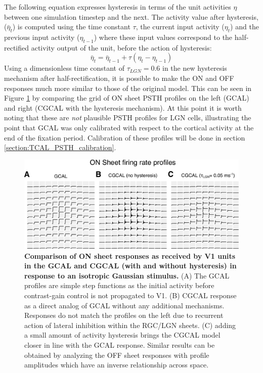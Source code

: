 \documentclass[phd,ianc,twoside]{infthesis}
\begin{document}
The following equation expresses hysteresis in terms of the unit
activities $\eta$ between one simulation timestep and the next. The
activity value after hysteresis, ($\bar{\eta}_t$) is computed using the
time constant $\tau$, the current input activity ($\eta_t$) and the
previous input activity ($\eta_{t-1}$) where these input values
correspond to the half-rectified activity output of the unit, before the
action of hysteresis:
\begin{equation}
  \bar{\eta}_t = \bar{\eta}_{t-1} + \tau (\eta_t - \eta_{t-1})
  \label{eq:hysteresis}
\end{equation}
Using a dimensionless time constant of $\tau_{LGN}=0.6$ in the new
hysteresis mechanism after half-rectification, it is possible to make
the ON and OFF responses much more similar to those of the original
model. This can be seen in Figure \ref{fig:CGCAL_LGN} by comparing the
grid of ON sheet PSTH profiles on the left (GCAL) and right (CGCAL with
the hysteresis mechanism). At this point it is worth noting that these
are \emph{not} plausible PSTH profiles for LGN cells, illustrating the
point that GCAL was only calibrated with respect to the cortical
activity at the end of the fixation period. Calibration of these
profiles will be done in section \ref{section:TCAL_PSTH_calibration}.


\begin{figure}
\centerline{ \includegraphics[scale=0.6]{./figures/CGCAL_LGN.pdf} }
\caption[]{{\bf Comparison of ON sheet responses as received by V1 units
    in the GCAL and CGCAL (with and without hysteresis) in response to
    an isotropic Gaussian stimulus.} (A) The GCAL profiles are simple
  step functions as the initial activity before contrast-gain control is
  not propagated to V1. (B) CGCAL response as a direct analog of GCAL
  without any additional mechanisms. Responses do not match the profiles
  on the left due to recurrent action of lateral inhibition within the
  RGC/LGN sheets. (C) adding a small amount of activity hysteresis
  brings the CGCAL model closer in line with the GCAL response. Similar
  results can be obtained by analyzing the OFF sheet responses with
  profile amplitudes which have an inverse relationship across space.}
\label{fig:CGCAL_LGN}
\end{figure}
\end{document}

